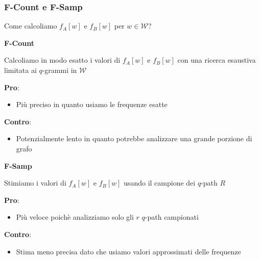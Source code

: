\begin{frame}
	\frametitle{F-Count e F-Samp}
	\centering
	
	Come calcoliamo $f_A[w]$ e $f_B[w]$ per $w \in \mathcal{W}$?\medskip
	
	\begin{minipage}{.45\textwidth}
		\centering
		\textbf{F-Count}
		
		Calcoliamo in modo esatto i valori di $f_A[w]$ e $f_B[w]$
		con una ricerca esaustiva limitata ai $q$-grammi in $\mathcal{W}$
		
		\bigskip
		
		\small		
		\textbf{Pro}:
		\begin{itemize}
			\item Più preciso in quanto usiamo le frequenze esatte
		\end{itemize}
		
		\textbf{Contro}:
		\begin{itemize}
			\item Potenzialmente lento in quanto potrebbe analizzare una grande porzione di grafo
		\end{itemize}
		
		\hfill
	\end{minipage}\hfill
	\begin{minipage}{.45\textwidth}
		\centering
		\textbf{F-Samp}	
		
		 Stimiamo i valori di $f_A[w]$ e $f_B[w]$ 
		 usando il campione dei $q$-path $R$
		 
		 
		 \bigskip
		 
		 \small		
		 \textbf{Pro}:
		 \begin{itemize}
		 	\item Più veloce poichè analizziamo solo gli $r$ $q$-path campionati
		 \end{itemize}
		 
		 \textbf{Contro}:
		 \begin{itemize}
		 	\item Stima meno precisa dato che usiamo valori approssimati delle frequenze
		 \end{itemize}
		 
		\hfill
	\end{minipage}\hfill
	
\end{frame}

